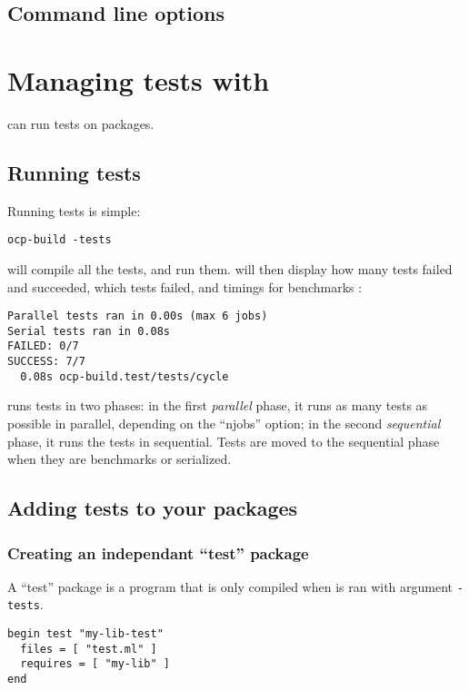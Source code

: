 \section{Command line options}

\chapter{Managing tests with \ocpbuild{}}

\ocpbuild{} can run tests on packages.

\section{Running tests}

Running tests is simple:
\begin{verbatim}
ocp-build -tests
\end{verbatim}

\ocpbuild{} will compile all the tests, and run them. \ocpbuild{} will
then display how many tests failed and succeeded, which tests failed,
and timings for benchmarks :

\begin{verbatim}
Parallel tests ran in 0.00s (max 6 jobs)
Serial tests ran in 0.08s
FAILED: 0/7
SUCCESS: 7/7
  0.08s	ocp-build.test/tests/cycle
\end{verbatim}

\ocpbuild{} runs tests in two phases: in the first \emph{parallel}
phase, it runs as many tests as possible in parallel, depending on the
``njobs'' option; in the second \emph{sequential} phase, it runs the
tests in sequential. Tests are moved to the sequential phase when they
are benchmarks or serialized.

\section{Adding tests to your packages}

\subsection{Creating an independant ``test'' package}

A ``test'' package is a program that is only compiled when 
\ocpbuild{} is ran with argument \verb+-tests+.

\begin{verbatim}
begin test "my-lib-test"
  files = [ "test.ml" ]
  requires = [ "my-lib" ]
end
\end{verbatim}

